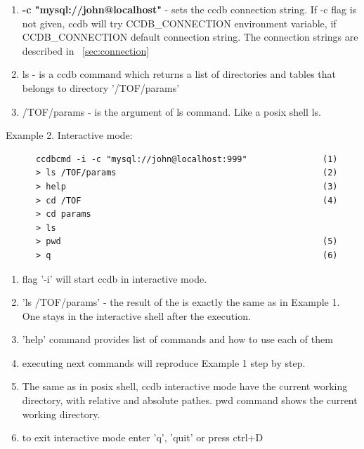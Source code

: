 \documentclass{article}
\begin{document}
\begin{enumerate}
\item \textbf{-c "mysql://john@localhost"} - sets the ccdb connection string. 
      If -c flag is not given, ccdb will try CCDB\_CONNECTION environment 
      variable, if CCDB\_CONNECTION  default connection string. The connection
      strings are described in ~\ref{sec:connection}

\item ls - is a ccdb command which returns a list of directories and tables
      that belongs to directory '/TOF/params'

\item /TOF/params - is the argument of ls command. Like a posix shell ls.
\end{enumerate}
\vspace{1 em}


Example 2. Interactive mode:
\begin{verbatim}
      ccdbcmd -i -c "mysql://john@localhost:999"               (1)
      > ls /TOF/params                                         (2)
      > help                                                   (3)
      > cd /TOF                                                (4)
      > cd params
      > ls
      > pwd                                                    (5)
      > q                                                      (6)
\end{verbatim}


\begin{enumerate}
  \item flag '-i'  will start ccdb in interactive mode.

  \item 'ls /TOF/params' - the result of the is exactly the same as in Example 1.
         One stays in the interactive shell after the execution.

  \item 'help' command provides list of commands and how to use each of them

  \item executing next commands will reproduce Example 1 step by step.

  \item  The same as in posix shell, ccdb interactive mode have the current 
         working directory, with relative and absolute pathes. 
         pwd command shows the current working directory.

  \item to exit interactive mode enter 'q', 'quit' or press ctrl+D
\end{enumerate}
\end{document}
